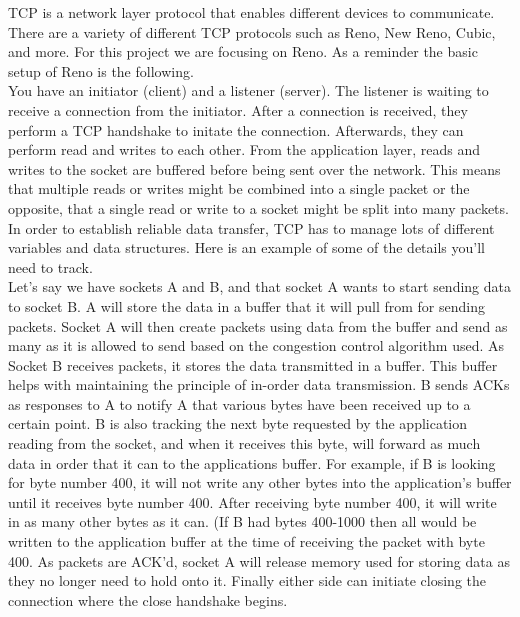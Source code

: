 TCP is a network layer protocol that enables different devices to communicate. There are a variety of different TCP protocols such as Reno, New Reno, Cubic, and more. For this project we are focusing on Reno. As a reminder the basic setup of Reno is the following. \\

You have an initiator (client) and a listener (server). The listener is waiting to receive a connection from the initiator. After a connection is received, they perform a TCP handshake to initate the connection. Afterwards, they can perform read and writes to each other. From the application layer, reads and writes to the socket are buffered before being sent over the network. This means that multiple reads or writes might be combined into a single packet or the opposite, that a single read or write to a socket might be split into many packets.\\

In order to establish reliable data transfer, TCP has to manage lots of different variables and data structures. Here is an example of some of the details you'll need to track.\\

Let's say we have sockets A and B, and that socket A wants to start sending data to socket B. A will store the data in a buffer that it will pull from for sending packets. Socket A will then create packets using data from the buffer and send as many as it is allowed to send based on the congestion control algorithm used. As Socket B receives packets, it stores the data transmitted in a buffer. This buffer helps with maintaining the principle of in-order data transmission.  B sends ACKs as responses to A to notify A that various bytes have been received up to a certain point. B is also tracking the next byte requested by the application reading from the socket, and when it receives this byte, will forward as much data in order that it can to the applications buffer. For example, if B is looking for byte number 400, it will not write any other bytes into the application's buffer until it receives byte number 400. After receiving byte number 400, it will write in as many other bytes as it can. (If B had bytes 400-1000 then all  would be written to the application buffer at the time of receiving the packet with byte 400. As packets are ACK'd, socket A will release memory used for storing data as they no longer need to hold onto it. Finally either side can initiate closing the connection where the close handshake begins. \\

